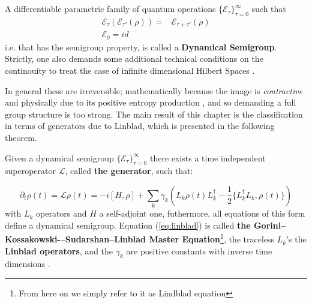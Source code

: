 \begin{definition}
  A differentiable parametric family of quantum operations $\{\mathcal{E}_{\tau}\}_{\tau=0}^{\infty}$ such that
  \begin{align}
    \mathcal{E}_{\tau}(\mathcal{E}_{\tau'}(\rho)) =& \mathcal{E}_{\tau + \tau'}(\rho)\\
    \mathcal{E}_{0} = id
  \end{align}
  i.e. that has the semigroup property, is called a \textbf{Dynamical Semigroup}. Strictly, one also demands
  some additional technical conditions on the continouity to treat the case of infinite dimensional Hilbert Spaces \cite{lindblad1976generators}.
\end{definition}

In general these are irreversible; mathematically because the image is \textit{contractive} and physically due to its
positive entropy production \cite{breuer2002theory}, and so demanding a full group structure is too strong. The main result
of this chapter is the classification in terms of generators due to Linblad, which is presented in the following theorem.

\begin{theorem}
  Given a dynamical semigroup $\{\mathcal{E}_{\tau}\}_{\tau=0}^{\infty}$ there exists a time independent superoperator $\mathcal{L}$, called
  \textbf{the generator}, such that:

  \begin{equation}\label{eq:linblad}
  \partial_{t}\rho(t) = \mathcal{L}\rho(t) = -i[ H,\rho ] + \sum_{k}\gamma_{k}\left(L_{k}\rho(t) L_{k}^{\dagger} - \frac{1}{2}\{L_{k}^{\dagger}L_{k}, \rho(t)\}\right)
  \end{equation}
  with $L_{k}$ operators  and $H$ a self-adjoint one, futhermore, all equations of this form define a dynamical semigroup.
  Equation (\ref{eq:linblad}) is called \textbf{the Gorini--Kossakowski-–Sudarshan--Linblad  Master Equation}\footnote{From here on we simply refer to it as Lindblad equation}, the traceless $L_{k}$'s the \textbf{Linblad operators}, and
  the $\gamma_{k}$ are positive constants with inverse time dimensions \cite{breuer2002theory, lindblad1976generators, wiseman_quantum_2010,hornberger2009introduction}.
\end{theorem}

